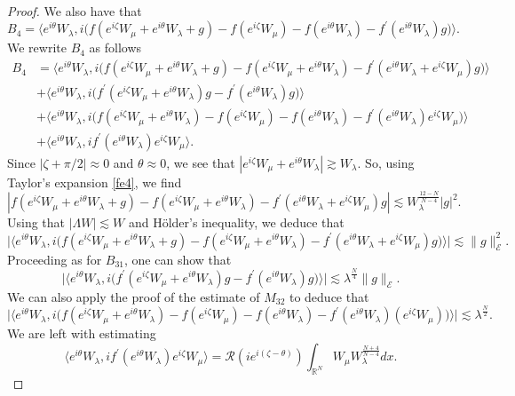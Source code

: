 \documentclass[a4paper,two-side,10pt]{amsart}
\newcommand{\R}{\mathbb{R}}
\numberwithin{equation}{section}
\begin{document}
\begin{proof}
We also have that
$$B_4 =  \big\langle  e^{i\theta}   W_\lambda , i\big( f(e^{i\zeta} W_\mu +e^{i\theta} W_\lambda +g) - f(e^{i\zeta} W_\mu) - f(e^{i\theta} W_\lambda) -f^\prime (e^{i\theta} W_\lambda) g \big)\big\rangle .$$
We rewrite $B_4$ as follows
\begin{align*}
B_4 &=\big\langle  e^{i\theta}   W_\lambda , i\big( f(e^{i\zeta} W_\mu +e^{i\theta} W_\lambda +g) - f(e^{i\zeta} W_\mu +e^{i\theta}W_\lambda)  -f^\prime (e^{i\theta} W_\lambda + e^{i\zeta} W_\mu) g \big)\big\rangle\\
&+ \big\langle  e^{i\theta}   W_\lambda ,  i\big( f^\prime (e^{i\zeta} W_\mu +e^{i\theta} W_\lambda )g - f^\prime (e^{i\theta} W_\lambda)g \big)\big\rangle \\
&+ \big\langle  e^{i\theta}   W_\lambda , i\big( f(e^{i\zeta} W_\mu +e^{i\theta} W_\lambda ) - f(e^{i\zeta} W_\mu)-f (e^{i\theta} W_\lambda) -f^\prime (e^{i\theta} W_\lambda) e^{i\zeta} W_\mu \big)\big\rangle\\
&+ \langle e^{i\theta } W_\lambda , if^\prime  (e^{i\theta} W_\lambda) e^{i\zeta} W_\mu \rangle .
\end{align*}
Since $|\zeta +\pi/2|\approx 0$ and $\theta \approx 0$, we see that $|e^{i\zeta} W_\mu +e^{i\theta} W_\lambda |\gtrsim W_\lambda$. So, using Taylor's expansion \eqref{fe4}, we find
$$| f(e^{i\zeta} W_\mu +e^{i\theta} W_\lambda +g) - f(e^{i\zeta} W_\mu +e^{i\theta} W_\lambda) -f^\prime (e^{i\theta} W_\lambda +e^{i\zeta} W_\mu) g| \lesssim W_\lambda^{\frac{12-N}{N-4}} |g|^2. $$
Using that $|\Lambda W|\lesssim W$ and H\"older's inequality, we deduce that
$$\big|   \big\langle  e^{i\theta}   W_\lambda , i\big( f(e^{i\zeta} W_\mu +e^{i\theta} W_\lambda +g) - f(e^{i\zeta} W_\mu +e^{i\theta} W_\lambda) -f^\prime (e^{i\theta} W_\lambda +e^{i\zeta} W_\mu) g \big)\big\rangle\big| \lesssim \|g\|_{\mathcal{E}}^2 .$$
Proceeding as for $B_{31}$, one can show that
$$\big|  \big\langle  e^{i\theta}   W_\lambda , i\big( f^\prime (e^{i\zeta} W_\mu +e^{i\theta} W_\lambda )g - f^\prime (e^{i\theta} W_\lambda)g\big) \big\rangle \big|\lesssim \lambda^{\frac{N}{4}} \|g\|_{\mathcal{E}}.$$
We can also apply the proof of the estimate of $M_{32}$ to deduce that
$$ \big|  \big\langle  e^{i\theta}   W_\lambda , i\big( f(e^{i\zeta} W_\mu +e^{i\theta} W_\lambda ) - f(e^{i\zeta} W_\mu)-f (e^{i\theta} W_\lambda) -f^\prime (e^{i\theta} W_\lambda)( e^{i\zeta} W_\mu) \big)\big\rangle\big| \lesssim \lambda^{\frac{N}{2}}.$$
We are left with estimating
$$\langle e^{i\theta } W_\lambda , if^\prime  (e^{i\theta} W_\lambda) e^{i\zeta} W_\mu \rangle = \mathcal{R} (ie^{i(\zeta -\theta)}) \int_{\R^N} W_\mu W_\lambda^{\frac{N+4}{N-4}}dx.$$

\end{proof}
\end{document}

